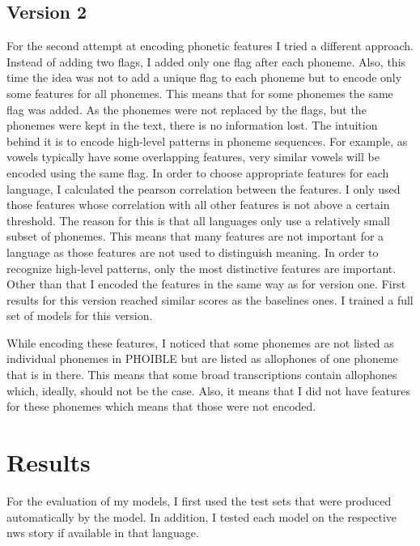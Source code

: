 \subsection*{Version 2}
For the second attempt at encoding phonetic features I tried a different approach. Instead of adding two flags, I added only one flag after each phoneme. Also, this time the idea was not to add a unique flag to each phoneme but to encode only some features for all phonemes. This means that for some phonemes the same flag was added. As the phonemes were not replaced by the flags, but the phonemes were kept in the text, there is no information lost. The intuition behind it is to encode high-level patterns in phoneme sequences. For example, as vowels typically have some overlapping features, very similar vowels will be encoded using the same flag. In order to choose appropriate features for each language, I calculated the pearson correlation between the features. I only used those features whose correlation with all other features is not above a certain threshold. The reason for this is that all languages only use a relatively small subset of phonemes. This means that many features are not important for a language as those features are not used to distinguish meaning. In order to recognize high-level patterns, only the most distinctive features are important. Other than that I encoded the features in the same way as for version one. First results for this version reached similar scores as the baselines ones. I trained a full set of models for this version.

While encoding these features, I noticed that some phonemes are not listed as individual phonemes in PHOIBLE but are listed as allophones of one phoneme that is in there. This means that some broad transcriptions contain allophones which, ideally, should not be the case. Also, it means that I did not have features for these phonemes which means that those were not encoded.  


\section{Results}

For the evaluation of my models, I first used the test sets that were produced automatically by the model. In addition, I tested each model on the respective \ac{nws} story if available in that language. 

